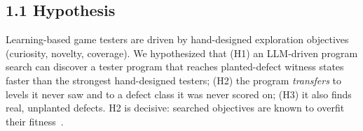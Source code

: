 
\subsection*{1.1 Hypothesis}
Learning-based game testers are driven by hand-designed exploration objectives (curiosity, novelty, coverage). We hypothesized
that (H1) an LLM-driven program search can discover a tester program that reaches planted-defect witness states faster than the
strongest hand-designed testers; (H2) the program \emph{transfers} to levels it never saw and to a defect class it was never scored
on; (H3) it also finds real, unplanted defects. H2 is decisive: searched objectives are known to overfit their fitness~\cite{dmmultiagent}.

